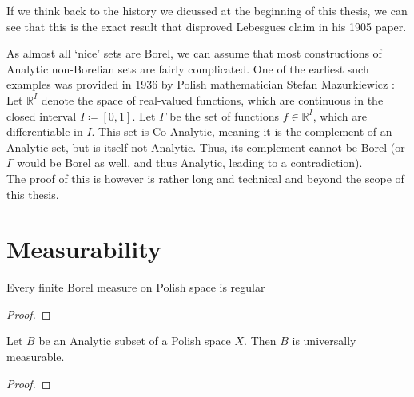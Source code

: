 \documentclass[10pt, a4paper, titlepage]{article}
\numberwithin{equation}{section}
\begin{document}
If we think back to the history we dicussed at the beginning of this thesis, we
can see that this is the exact result that disproved Lebesgues claim in his 1905
paper.
\begin{example}
	As almost all `nice' sets are Borel, we can assume that most constructions of Analytic non-Borelian sets are fairly complicated. 
	One of the earliest such examples was provided in 1936 by Polish mathematician Stefan Mazurkiewicz \cite{mazurkiewicz1936}:\\
	Let $\mathbb{R}^I$ denote the space of real-valued functions, which are continuous in the closed interval $I \coloneq[0,1]$. Let  $\Gamma$ be the set of functions  $f \in \mathbb{R}^I$, which are differentiable in $I$. This set is Co-Analytic, meaning it is the complement of an Analytic set, but is itself not Analytic. 
	Thus, its complement cannot be Borel (or $\Gamma$ would be Borel as well, and thus Analytic, leading to a contradiction). \\
	The proof of this is however is rather long and technical and beyond the scope of this thesis.
	
\end{example}



\section{Measurability}

\begin{definition}[$\mu$-Measurable]
	
\end{definition}

\begin{definition}
	
\end{definition}

\begin{theorem}
	Every finite Borel measure on Polish space is regular
\end{theorem}
\begin{proof}
	
\end{proof}
\begin{theorem}
	Let $B$ be an Analytic subset of a Polish space $X$. Then $B$ is universally measurable.
\end{theorem}
\begin{proof}
	
\end{proof}
\end{document}
